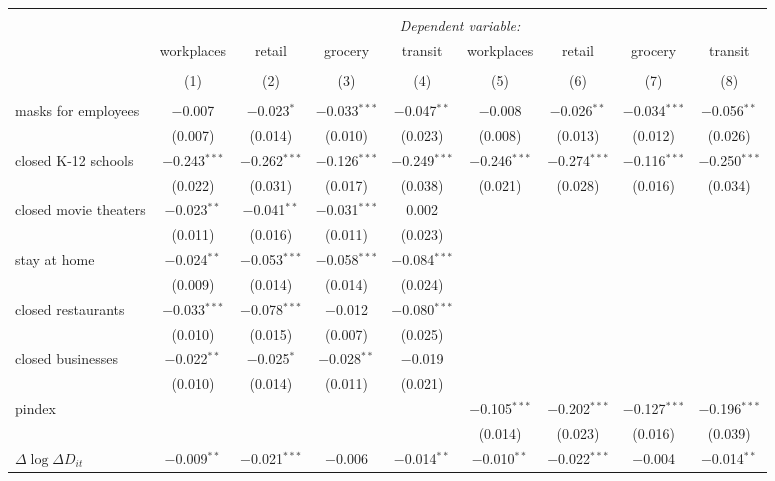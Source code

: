 \begin{tabular}{@{\extracolsep{1pt}}lcccccccc} 
\\[-1.8ex]\hline 
\hline \\[-1.8ex] 
 & \multicolumn{8}{c}{\textit{Dependent variable:}} \\ 
\cline{2-9} 
 & workplaces & retail & grocery & transit & workplaces & retail & grocery & transit \\ 
\\[-1.8ex] & (1) & (2) & (3) & (4) & (5) & (6) & (7) & (8)\\ 
\hline \\[-1.8ex] 
 masks for employees & $-$0.007 & $-$0.023$^{*}$ & $-$0.033$^{***}$ & $-$0.047$^{**}$ & $-$0.008 & $-$0.026$^{**}$ & $-$0.034$^{***}$ & $-$0.056$^{**}$ \\ 
  & (0.007) & (0.014) & (0.010) & (0.023) & (0.008) & (0.013) & (0.012) & (0.026) \\ 
  closed K-12 schools & $-$0.243$^{***}$ & $-$0.262$^{***}$ & $-$0.126$^{***}$ & $-$0.249$^{***}$ & $-$0.246$^{***}$ & $-$0.274$^{***}$ & $-$0.116$^{***}$ & $-$0.250$^{***}$ \\ 
  & (0.022) & (0.031) & (0.017) & (0.038) & (0.021) & (0.028) & (0.016) & (0.034) \\ 
  closed movie theaters & $-$0.023$^{**}$ & $-$0.041$^{**}$ & $-$0.031$^{***}$ & 0.002 &  &  &  &  \\ 
  & (0.011) & (0.016) & (0.011) & (0.023) &  &  &  &  \\ 
  stay at home & $-$0.024$^{**}$ & $-$0.053$^{***}$ & $-$0.058$^{***}$ & $-$0.084$^{***}$ &  &  &  &  \\ 
  & (0.009) & (0.014) & (0.014) & (0.024) &  &  &  &  \\ 
  closed restaurants & $-$0.033$^{***}$ & $-$0.078$^{***}$ & $-$0.012 & $-$0.080$^{***}$ &  &  &  &  \\ 
  & (0.010) & (0.015) & (0.007) & (0.025) &  &  &  &  \\ 
  closed businesses & $-$0.022$^{**}$ & $-$0.025$^{*}$ & $-$0.028$^{**}$ & $-$0.019 &  &  &  &  \\ 
  & (0.010) & (0.014) & (0.011) & (0.021) &  &  &  &  \\ 
  pindex &  &  &  &  & $-$0.105$^{***}$ & $-$0.202$^{***}$ & $-$0.127$^{***}$ & $-$0.196$^{***}$ \\ 
  &  &  &  &  & (0.014) & (0.023) & (0.016) & (0.039) \\ 
  $\Delta \log \Delta D_{it}$ & $-$0.009$^{**}$ & $-$0.021$^{***}$ & $-$0.006 & $-$0.014$^{**}$ & $-$0.010$^{**}$ & $-$0.022$^{***}$ & $-$0.004 & $-$0.014$^{**}$ \\ 

\end{tabular}
